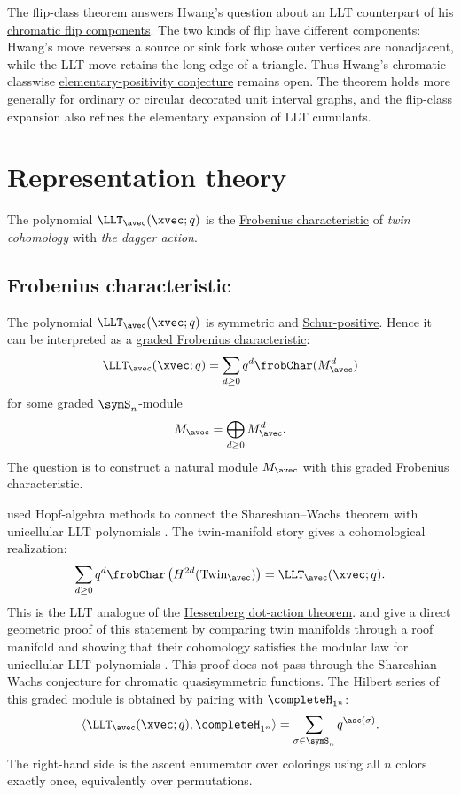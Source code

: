 The flip-class theorem answers Hwang's question about an LLT counterpart of his
\hyperref[chromaticFlipComponents]{chromatic flip components}.  The two kinds
of flip have different components: Hwang's move reverses a source or sink fork
whose outer vertices are nonadjacent, while the LLT move retains the long edge
of a triangle.  Thus Hwang's chromatic classwise
\hyperref[hwangFlipComponentConjecture]{elementary-positivity conjecture}
remains open.  The theorem holds more generally for ordinary or
circular decorated unit interval graphs, and the flip-class expansion also
refines the elementary expansion of LLT cumulants.


\section[unicellularLLTRepresentationTheory]{Representation theory}

The polynomial $\LLT_\avec(\xvec;q)$ is the
\hyperref[frobeniusCharacteristic]{Frobenius characteristic} of
\emph{twin cohomology} with \emph{the dagger action}.

\subsection[unicellularLLTFrobeniusTarget]{Frobenius characteristic}

The polynomial $\LLT_\avec(\xvec;q)$ is symmetric and
\hyperref[schurPositivity]{Schur-positive}.
Hence it can be interpreted as a
\hyperref[frobeniusCharacteristic]{graded Frobenius characteristic}:
\[
\LLT_\avec(\xvec;q)
=
\sum_{d\geq 0}q^d\frobChar(M_\avec^d)
\]
for some graded $\symS_n$-module
\[
M_\avec=\bigoplus_{d\geq 0}M_\avec^d.
\]
The question is to construct a natural module $M_\avec$ with this graded
Frobenius characteristic.

 used Hopf-algebra methods to connect the
Shareshian--Wachs theorem with unicellular LLT polynomials
\cite{GuayPaquet2016x}.  The twin-manifold story gives a cohomological
realization:
\[
\sum_{d\geq 0} q^d
\frobChar\left(H^{2d}(\mathrm{Twin}_\avec)\right)
=
\LLT_\avec(\xvec;q).
\]
This is the LLT analogue of the
\hyperref[dotAction]{Hessenberg dot-action theorem}.
 and  give a direct geometric proof
of this statement by comparing twin manifolds through a roof manifold and
showing that their cohomology satisfies the modular law for unicellular LLT
polynomials \cite[Thm.~5.4]{KiemLee2024Twin}.  This proof does not pass
through the Shareshian--Wachs conjecture for chromatic quasisymmetric
functions.
The Hilbert series of this graded module is obtained by pairing with
$\completeH_{1^n}$:
\[
\left\langle \LLT_\avec(\xvec;q),\completeH_{1^n}\right\rangle
=
\sum_{\sigma\in\symS_n}q^{\asc(\sigma)}.
\]
The right-hand side is the ascent enumerator over colorings using all $n$
colors exactly once, equivalently over permutations.

